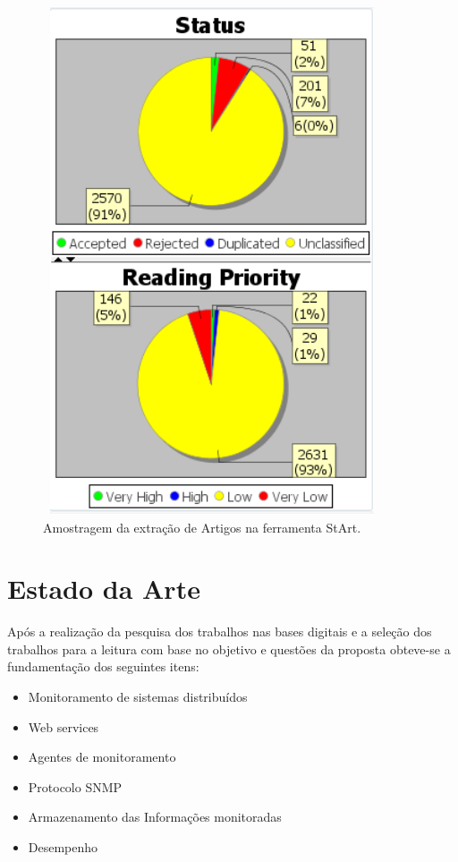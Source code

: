 \begin{figure}[!ht]
\centering
\includegraphics[width = 10cm, height=15cm]{img/extra__oRSLStArt.png}
\caption{Amostragem da extração de Artigos na ferramenta StArt.}
\label{fig:StArt}
\end{figure}



\section{Estado da Arte}
Após a realização da pesquisa dos trabalhos nas bases digitais e a seleção dos trabalhos para a leitura com base no objetivo e questões da proposta obteve-se a fundamentação dos seguintes itens:
\begin{itemize}
\item Monitoramento de sistemas distribuídos
\item Web services
\item Agentes de monitoramento
\item Protocolo SNMP
\item Armazenamento das Informações monitoradas
\item Desempenho
\end{itemize}

